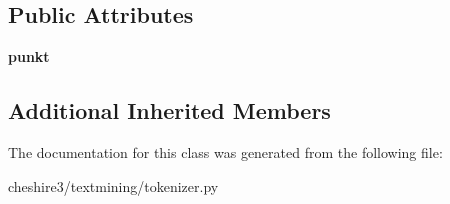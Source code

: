\subsection*{Public Attributes}
\begin{DoxyCompactItemize}
\item 
\hypertarget{classcheshire3_1_1textmining_1_1tokenizer_1_1_nltk_punkt_sentence_tokenizer_a7d7bd36d3f8392d2de2be9f61a9c32b4}{{\bfseries punkt}}\label{classcheshire3_1_1textmining_1_1tokenizer_1_1_nltk_punkt_sentence_tokenizer_a7d7bd36d3f8392d2de2be9f61a9c32b4}

\end{DoxyCompactItemize}
\subsection*{Additional Inherited Members}


The documentation for this class was generated from the following file\-:\begin{DoxyCompactItemize}
\item 
cheshire3/textmining/tokenizer.\-py\end{DoxyCompactItemize}
